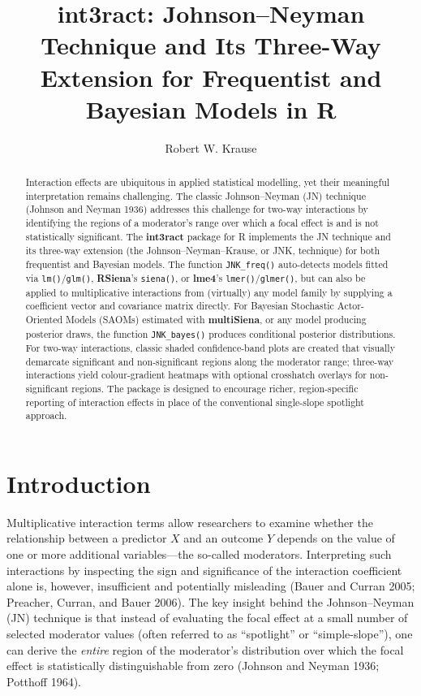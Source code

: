 \documentclass[
  letterpaper,
  DIV=11,
  numbers=noendperiod]{scrartcl}
\title{\textbf{int3ract}: Johnson--Neyman Technique and Its Three-Way
Extension for Frequentist and Bayesian Models in R}
\author{Robert W. Krause}
\date{}
\begin{document}
\maketitle
\begin{abstract}
Interaction effects are ubiquitous in applied statistical modelling, yet
their meaningful interpretation remains challenging. The classic
Johnson--Neyman (JN) technique (Johnson and Neyman 1936) addresses this
challenge for two-way interactions by identifying the regions of a
moderator's range over which a focal effect is and is not statistically
significant. The \textbf{int3ract} package for R implements the JN
technique and its three-way extension (the Johnson--Neyman--Krause, or
JNK, technique) for both frequentist and Bayesian models. The function
\texttt{JNK\_freq()} auto-detects models fitted via
\texttt{lm()}/\texttt{glm()}, \textbf{RSiena}'s \texttt{siena()}, or
\textbf{lme4}'s \texttt{lmer()}/\texttt{glmer()}, but can also be
applied to multiplicative interactions from (virtually) any model family
by supplying a coefficient vector and covariance matrix directly. For
Bayesian Stochastic Actor-Oriented Models (SAOMs) estimated with
\textbf{multiSiena}, or any model producing posterior draws, the
function \texttt{JNK\_bayes()} produces conditional posterior
distributions. For two-way interactions, classic shaded confidence-band
plots are created that visually demarcate significant and
non-significant regions along the moderator range; three-way
interactions yield colour-gradient heatmaps with optional crosshatch
overlays for non-significant regions. The package is designed to
encourage richer, region-specific reporting of interaction effects in
place of the conventional single-slope spotlight approach.
\end{abstract}


\section{Introduction}\label{sec-intro}

Multiplicative interaction terms allow researchers to examine whether
the relationship between a predictor \(X\) and an outcome \(Y\) depends
on the value of one or more additional variables---the so-called
moderators. Interpreting such interactions by inspecting the sign and
significance of the interaction coefficient alone is, however,
insufficient and potentially misleading (Bauer and Curran 2005;
Preacher, Curran, and Bauer 2006). The key insight behind the
Johnson--Neyman (JN) technique is that instead of evaluating the focal
effect at a small number of selected moderator values (often referred to
as ``spotlight'' or ``simple-slope''), one can derive the \emph{entire}
region of the moderator's distribution over which the focal effect is
statistically distinguishable from zero (Johnson and Neyman 1936;
Potthoff 1964).
\end{document}
